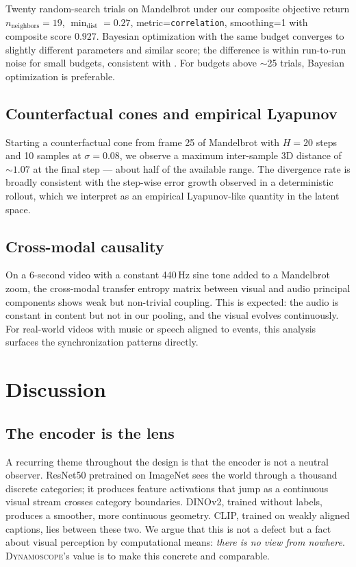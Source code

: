 \documentclass[11pt,a4paper]{article}
\begin{document}
Twenty random-search trials on Mandelbrot under our composite
objective return $n_{\text{neighbors}}=19$, $\min_{\text{dist}}=0.27$,
metric=\texttt{correlation}, smoothing=1 with composite score
$0.927$. Bayesian optimization with the same budget converges to
slightly different parameters and similar score; the difference is
within run-to-run noise for small budgets, consistent with
\cite{bergstra2012random}. For budgets above $\sim$25 trials,
Bayesian optimization is preferable.

\subsection{Counterfactual cones and empirical Lyapunov}

Starting a counterfactual cone from frame 25 of Mandelbrot with
$H=20$ steps and 10 samples at $\sigma=0.08$, we observe a maximum
inter-sample 3D distance of $\sim 1.07$ at the final step --- about
half of the available range. The divergence rate is broadly
consistent with the step-wise error growth observed in a
deterministic rollout, which we interpret as an empirical
Lyapunov-like quantity in the latent space.

\subsection{Cross-modal causality}

On a 6-second video with a constant 440\,Hz sine tone added to a
Mandelbrot zoom, the cross-modal transfer entropy matrix between
visual and audio principal components shows weak but non-trivial
coupling. This is expected: the audio is constant in content but
not in our pooling, and the visual evolves continuously. For
real-world videos with music or speech aligned to events, this
analysis surfaces the synchronization patterns directly.

\section{Discussion}

\subsection{The encoder is the lens}

A recurring theme throughout the design is that the encoder is not a
neutral observer. ResNet50 pretrained on ImageNet sees the world
through a thousand discrete categories; it produces feature
activations that jump as a continuous visual stream crosses category
boundaries. DINOv2, trained without labels, produces a smoother,
more continuous geometry. CLIP, trained on weakly aligned
captions, lies between these two. We argue that this is not a defect
but a fact about visual perception by computational means:
\emph{there is no view from nowhere}. \textsc{Dynamoscope}'s value is
to make this concrete and comparable.
\end{document}
